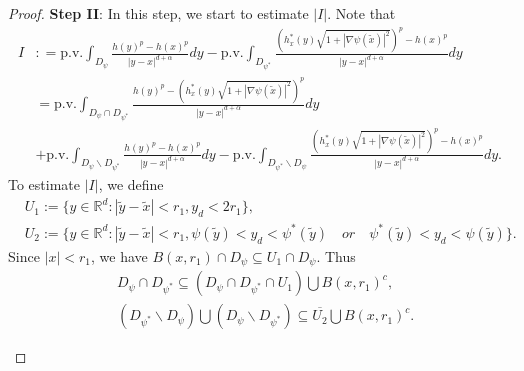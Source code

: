 \documentclass[12pt,a4paper]{amsart}
\numberwithin{equation}{section}
\theoremstyle{plain}
\newcommand{\mb}{\mathbb}
\newcommand{\wt}{\widetilde}
\newcommand{\ppv}{\text{p.v.}}
\newcommand{\1}{\mathbbm{1}}
\begin{document}
\begin{proof}
\noindent \textbf{Step II}: In this step, we start to estimate $|I|$. Note that
\begin{equation}
\begin{aligned}
    I &: = \text{p.v.}\int_{D_{\psi}} \frac{h(y)^p - h(x)^p}{|y-x|^{d+\alpha}}dy - \ppv \int_{D_{\psi^*}} \frac{(h_x^*(y)\sqrt{1+|\nabla \psi(\wt x)|^2})^p - h(x)^p}{|y-x|^{d+\alpha}}dy \\
    & = \ppv \int_{D_{\psi} \cap D_{\psi^*}} \frac{h(y)^p - (h_x^*(y)\sqrt{1+|\nabla \psi(\wt x)|^2})^p}{|y-x|^{d+\alpha}}dy \\
    & + \text{p.v.}\int_{D_{\psi}\backslash D_{\psi^*}} \frac{h(y)^p - h(x)^p}{|y-x|^{d+\alpha}}dy - \ppv \int_{D_{\psi^*}\backslash D_{\psi}} \frac{(h_x^*(y)\sqrt{1+|\nabla \psi(\wt x)|^2})^p - h(x)^p}{|y-x|^{d+\alpha}}dy.
\end{aligned}
\end{equation}
To estimate $|I|$, we define
\begin{align*}
& U_1:= \{y\in \mb R^d: |\wt y - \wt x| < r_1, y_d < 2r_1\}, \\
& U_2:= \{y \in \mb R^d: |\wt y - \wt x| < r_1, \psi(\wt y)< y_d < \psi^*(\wt y)\quad or\quad  \psi^*(\wt y)< y_d < \psi(\wt y)\}.
\end{align*}
Since $|x|< r_1$, we have $B(x,r_1) \cap D_{\psi} \subseteq U_1 \cap D_{\psi}$. Thus
\begin{align*}
    & D_{\psi} \cap D_{\psi^*} \subseteq (D_{\psi} \cap D_{\psi^*} \cap U_1) \bigcup B(x,r_1)^c, \\
    & (D_{\psi^*}\backslash D_{\psi}) \bigcup (D_{\psi}\backslash D_{\psi^*}) \subseteq \overline{U_2} \bigcup B(x,r_1)^c.
\end{align*}
\begin{center}
\begin{figure}
\end{figure}
\end{center}
\end{proof}
\end{document}
